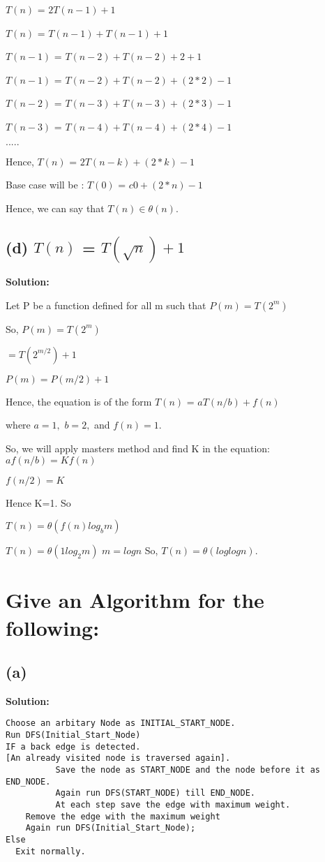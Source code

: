 \documentclass[12pt]{article}
\begin{document}
$T(n)$ = $2T(n-1)+1$

$T(n)$ = $T(n-1)+T(n-1)+1$

$T(n-1)$ = $T(n-2)+T(n-2)+2+1$

$T(n-1)$ = $T(n-2)+T(n-2)+(2*2)-1$

$T(n-2)$ = $T(n-3)+T(n-3)+(2*3)-1$

$T(n-3)$ = $T(n-4)+T(n-4)+(2*4)-1$

$.....$

Hence, $T(n)$ = $2T(n-k)+(2*k)-1$
 
Base case will be : $T(0)$ = $c0+(2*n)-1$

Hence, we can say that $T(n)\in\theta(n)$. 


\subsection{(d) $T(n)$ = $T(\sqrt n)+1$}
\textbf{Solution:}

Let P be a function defined for all m such that
$P(m)=T(2^m)$

So, 
$P(m)= T(2^m)$

$    = T(2^{m/2})+1$

$P(m)= P(m/2)+1$

Hence, the equation is of the form $T(n)$ = $aT(n/b)+f(n)$

where $a=1,$ $b=2,$ and $f(n)=1.$

So, we will apply masters method and find K in the equation:
$af(n/b) = Kf(n)$

$f(n/2) = K$

Hence K=1. So 

$T(n)=\theta(f(n)log_b m)$

$T(n)=\theta(1log_2 m)$
$m=log n$
So, $T(n)=\theta(log log n)$.

\section{Give an Algorithm for the following:}
\subsection{(a)}
\textbf{Solution:}



\begin{verbatim}
Choose an arbitary Node as INITIAL_START_NODE.
Run DFS(Initial_Start_Node) 
IF a back edge is detected.
[An already visited node is traversed again].
          Save the node as START_NODE and the node before it as END_NODE.
          Again run DFS(START_NODE) till END_NODE.
          At each step save the edge with maximum weight.
    Remove the edge with the maximum weight
    Again run DFS(Initial_Start_Node);
Else 
  Exit normally.
\end{verbatim}
\end{document}

